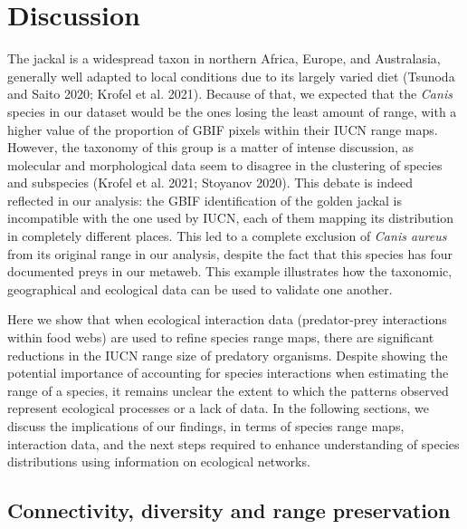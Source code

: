 \documentclass[10pt,oneside]{article}
\begin{document}
\hypertarget{discussion}{%
\section{Discussion}\label{discussion}}

The jackal is a widespread taxon in northern Africa, Europe, and
Australasia, generally well adapted to local conditions due to its
largely varied diet (Tsunoda and Saito 2020; Krofel et al. 2021).
Because of that, we expected that the \emph{Canis} species in our
dataset would be the ones losing the least amount of range, with a
higher value of the proportion of GBIF pixels within their IUCN range
maps. However, the taxonomy of this group is a matter of intense
discussion, as molecular and morphological data seem to disagree in the
clustering of species and subspecies (Krofel et al. 2021; Stoyanov
2020). This debate is indeed reflected in our analysis: the GBIF
identification of the golden jackal is incompatible with the one used by
IUCN, each of them mapping its distribution in completely different
places. This led to a complete exclusion of \emph{Canis aureus} from its
original range in our analysis, despite the fact that this species has
four documented preys in our metaweb. This example illustrates how the
taxonomic, geographical and ecological data can be used to validate one
another.

Here we show that when ecological interaction data (predator-prey
interactions within food webs) are used to refine species range maps,
there are significant reductions in the IUCN range size of predatory
organisms. Despite showing the potential importance of accounting for
species interactions when estimating the range of a species, it remains
unclear the extent to which the patterns observed represent ecological
processes or a lack of data. In the following sections, we discuss the
implications of our findings, in terms of species range maps,
interaction data, and the next steps required to enhance understanding
of species distributions using information on ecological networks.

\hypertarget{connectivity-diversity-and-range-preservation}{%
\subsection{Connectivity, diversity and range
preservation}\label{connectivity-diversity-and-range-preservation}}
\end{document}
